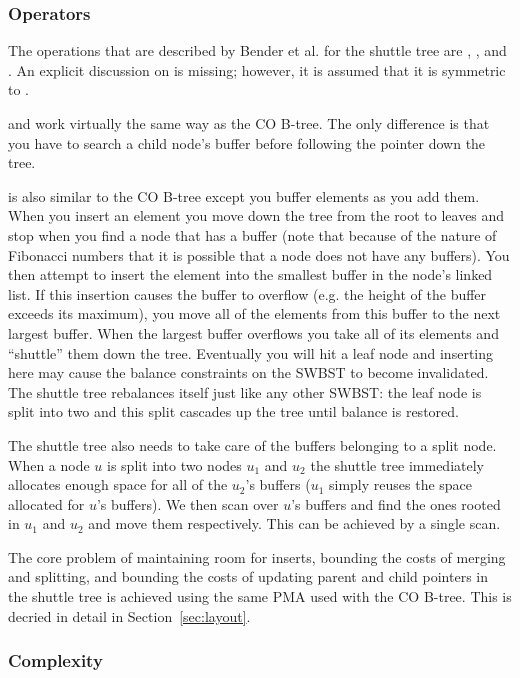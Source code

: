 \documentclass{style}
\begin{document}
\subsubsection{Operators}

The operations that are described by Bender et al. for the shuttle tree are
\Search{}, \Insert{}, and \Scan{}. An explicit discussion on \Delete{} is
missing; however, it is assumed that it is symmetric to \Insert{}.

\Search{} and \Scan{} work virtually the same way as the CO B-tree. The only
difference is that you have to search a child node's buffer before following
the pointer down the tree.

\Insert{} is also similar to the CO B-tree except you buffer elements as you
add them. When you insert an element you move down the tree from the root to
leaves and stop when you find a node that has a buffer (note that because of
the nature of Fibonacci numbers that it is possible that a node does not have
any buffers). You then attempt to insert the element into the smallest buffer
in the node's linked list. If this insertion causes the buffer to overflow
(e.g. the height of the buffer exceeds its maximum), you move all of the
elements from this buffer to the next largest buffer. When the largest buffer
overflows you take all of its elements and ``shuttle'' them down the tree.
Eventually you will hit a leaf node and inserting here may cause the balance
constraints on the SWBST to become invalidated. The shuttle tree rebalances
itself just like any other SWBST: the leaf node is split into two and this
split cascades up the tree until balance is restored.

The shuttle tree also needs to take care of the buffers belonging to a split
node. When a node $u$ is split into two nodes $u_1$ and $u_2$ the shuttle tree
immediately allocates enough space for all of the $u_2$'s buffers ($u_1$
simply reuses the space allocated for $u$'s buffers). We then scan over $u$'s
buffers and find the ones rooted in $u_1$ and $u_2$ and move them
respectively. This can be achieved by a single scan.

The core problem of maintaining room for inserts, bounding the costs of
merging and splitting, and bounding the costs of updating parent and child
pointers in the shuttle tree is achieved using the same PMA used with the CO
B-tree. This is decried in detail in Section~\ref{sec:layout}.

\subsubsection{Complexity}
\end{document}
